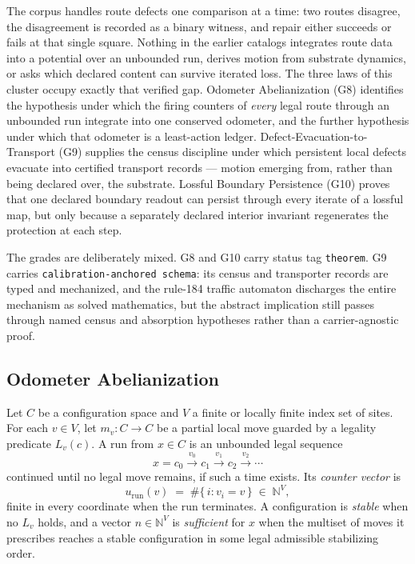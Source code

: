 \documentclass[11pt]{article}
\newcommand{\lawGEight}{Odometer Abelianization}
\newcommand{\lawGNine}{Defect-Evacuation-to-Transport}
\newcommand{\lawGTen}{Lossful Boundary Persistence}
\theoremstyle{definition}
\begin{document}
The corpus handles route defects one comparison at a time: two routes disagree, the disagreement is
recorded as a binary witness, and repair either succeeds or fails at that single square. Nothing in the
earlier catalogs integrates route data into a potential over an unbounded run, derives motion from
substrate dynamics, or asks which declared content can survive iterated loss. The three laws of this
cluster occupy exactly that verified gap. \lawGEight{} (G8) identifies the hypothesis under which the
firing counters of \emph{every} legal route through an unbounded run integrate into one conserved
odometer, and the further hypothesis under which that odometer is a least-action ledger.
\lawGNine{} (G9) supplies the census discipline under which persistent local defects evacuate into
certified transport records --- motion emerging from, rather than being declared over, the substrate.
\lawGTen{} (G10) proves that one declared boundary readout can persist through every iterate of a
lossful map, but only because a separately declared interior invariant regenerates the protection at
each step.

The grades are deliberately mixed. G8 and G10 carry status tag \texttt{theorem}. G9 carries
\texttt{calibration-anchored schema}: its census and transporter records are typed and mechanized, and
the rule-184 traffic automaton discharges the entire mechanism as solved mathematics, but the abstract
implication still passes through named census and absorption hypotheses rather than a carrier-agnostic
proof.

\subsection{\lawGEight}\label{sec:clusterC:g8}

Let $C$ be a configuration space and $V$ a finite or locally finite index set of sites. For each
$v \in V$, let $m_v : C \to C$ be a partial local move guarded by a legality predicate $L_v(c)$. A run
from $x \in C$ is an unbounded legal sequence
\[
  x = c_0 \xrightarrow{\,v_0\,} c_1 \xrightarrow{\,v_1\,} c_2 \xrightarrow{\,v_2\,} \cdots
\]
continued until no legal move remains, if such a time exists. Its \emph{counter vector} is
\[
  u_{\mathrm{run}}(v) \;=\; \#\{\, i : v_i = v \,\} \;\in\; \mathbb{N}^{V},
\]
finite in every coordinate when the run terminates. A configuration is \emph{stable} when no $L_v$
holds, and a vector $n \in \mathbb{N}^{V}$ is \emph{sufficient} for $x$ when the multiset of moves it
prescribes reaches a stable configuration in some legal admissible stabilizing order.
\end{document}
